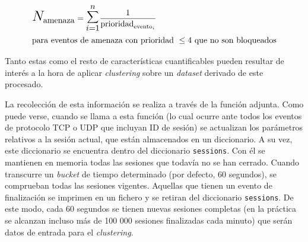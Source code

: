 \begin{eqnarray*}
    & \mathlarger{\mathlarger{\mathlarger{N}}}_{\textrm{amenaza}} = \mathlarger{\mathlarger{\mathlarger{\sum}}}_{i=1}^{n} \frac{1}{\textrm{prioridad}_{\textrm{evento}_i}}\\
    & \textrm{para eventos de amenaza con prioridad }\leq4\textrm{ que no son bloqueados}
\end{eqnarray*}

Tanto estas como el resto de características cuantificables pueden resultar de interés a la hora de aplicar \emph{clustering} sobre un \emph{dataset} derivado de este procesado.

La recolección de esta información se realiza a través de la función adjunta.
Como puede verse, cuando se llama a esta función (lo cual ocurre ante todos los eventos de protocolo TCP o UDP que incluyan ID de sesión)
se actualizan los parámetros relativos a la sesión actual, que están almacenados en un diccionario.
A su vez, este diccionario se encuentra dentro del diccionario \texttt{sessions}.
Con él se mantienen en memoria todas las sesiones que todavía no se han cerrado.
Cuando transcurre un \emph{bucket} de tiempo determinado (por defecto, 60 segundos), se comprueban todas las sesiones vigentes.
Aquellas que tienen un evento de finalización se imprimen en un fichero y se retiran del diccionario \texttt{sessions}.
De este modo, cada 60 segundos se tienen nuevas sesiones completas (en la práctica se alcanzan incluso más de 100 000 sesiones finalizadas cada minuto)
que serán datos de entrada para el \emph{clustering}.

